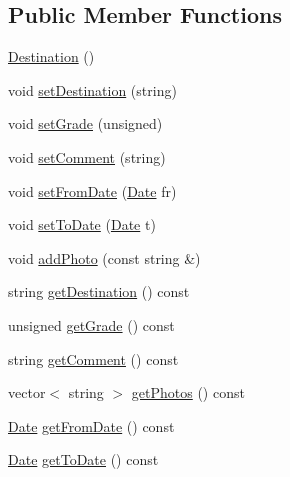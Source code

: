 \subsection*{Public Member Functions}
\begin{DoxyCompactItemize}
\item 
\hyperlink{class_destination_ac23f3307b89ac7a8fa8aa8d4ff3e22a6}{Destination} ()
\item 
void \hyperlink{class_destination_a9cafaaf83be9ea548401caf2a2c4d839}{set\+Destination} (string)
\item 
void \hyperlink{class_destination_ac7f1c3be54b5223aa1e9ad4523ef6976}{set\+Grade} (unsigned)
\item 
void \hyperlink{class_destination_a08199ade6e0bf7488d796d85dec8cfd9}{set\+Comment} (string)
\item 
void \hyperlink{class_destination_a6fc539f51a5fd6844fef290facc4e887}{set\+From\+Date} (\hyperlink{class_date}{Date} fr)
\item 
void \hyperlink{class_destination_afec038764d48882a9005cea50e418219}{set\+To\+Date} (\hyperlink{class_date}{Date} t)
\item 
void \hyperlink{class_destination_a6494a9eae34083fd09861ba8f6923e92}{add\+Photo} (const string \&)
\item 
string \hyperlink{class_destination_a6544fb0fa820f5a6b914a38cdcc949f9}{get\+Destination} () const
\item 
unsigned \hyperlink{class_destination_a34dd7a2072743078d5067d336dc3c25d}{get\+Grade} () const
\item 
string \hyperlink{class_destination_a4d20ef4e561fa10dd81561b9cd61c55c}{get\+Comment} () const
\item 
vector$<$ string $>$ \hyperlink{class_destination_ade746815624a6fd5add31a3475e04b45}{get\+Photos} () const
\item 
\hyperlink{class_date}{Date} \hyperlink{class_destination_ac6265579620a20899f5e4cf817d037c8}{get\+From\+Date} () const
\item 
\hyperlink{class_date}{Date} \hyperlink{class_destination_a6a98c7e1c0ffa4b821d3f7dd85cad3dd}{get\+To\+Date} () const
\end{DoxyCompactItemize}
